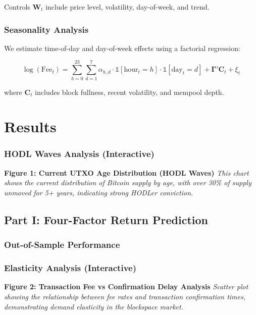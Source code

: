 \documentclass[
  12pt,
  letterpaper,
  DIV=11,
  numbers=noendperiod]{scrartcl}
\begin{document}
Controls \(\mathbf{W}_t\) include price level, volatility, day-of-week,
and trend.

\subsubsection{Seasonality Analysis}\label{seasonality-analysis}

We estimate time-of-day and day-of-week effects using a factorial
regression:

\[\log(\text{Fee}_{t}) = \sum_{h=0}^{23} \sum_{d=1}^{7} \alpha_{h,d} \cdot \mathbb{1}[\text{hour}_t = h] \cdot \mathbb{1}[\text{day}_t = d] + \mathbf{\Gamma}' \mathbf{C}_t + \xi_t\]

where \(\mathbf{C}_t\) includes block fullness, recent volatility, and
mempool depth.

\section{Results}\label{results}

\subsubsection{HODL Waves Analysis
(Interactive)}\label{hodl-waves-analysis-interactive}

\textbf{Figure 1: Current UTXO Age Distribution (HODL Waves)} \emph{This
chart shows the current distribution of Bitcoin supply by age, with over
30\% of supply unmoved for 5+ years, indicating strong HODLer
conviction.}

\subsection{Part I: Four-Factor Return
Prediction}\label{part-i-four-factor-return-prediction}

\subsubsection{Out-of-Sample
Performance}\label{out-of-sample-performance}

\subsubsection{Elasticity Analysis
(Interactive)}\label{elasticity-analysis-interactive}

\textbf{Figure 2: Transaction Fee vs Confirmation Delay Analysis}
\emph{Scatter plot showing the relationship between fee rates and
transaction confirmation times, demonstrating demand elasticity in the
blockspace market.}
\end{document}
